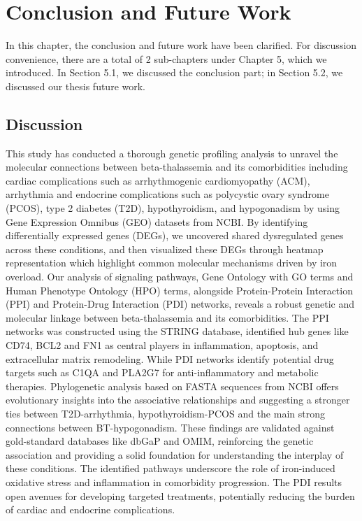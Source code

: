 %
% 
\let\textcircled=\pgftextcircled
\chapter{Conclusion and Future Work}
\label{chap:result}
In this chapter, the conclusion and future work have been clarified. For discussion convenience, there are a total of 2 sub-chapters under Chapter 5, which we introduced. In Section 5.1, we discussed the conclusion part; in Section 5.2, we discussed our thesis future work.

\vspace{150mm}

\section{Discussion}
This study has conducted a thorough genetic profiling analysis to unravel the molecular connections between beta-thalassemia and its comorbidities including cardiac complications such as arrhythmogenic cardiomyopathy (ACM), arrhythmia and endocrine complications such as polycystic ovary syndrome (PCOS), type 2 diabetes (T2D), hypothyroidism, and hypogonadism by using Gene Expression Omnibus (GEO) datasets from NCBI. By identifying differentially expressed genes (DEGs), we uncovered shared dysregulated genes across these conditions, and then visualized these DEGs through heatmap representation which highlight common molecular mechanisms driven by iron overload. Our analysis of signaling pathways, Gene Ontology with GO terms and Human Phenotype Ontology (HPO) terms, alongside Protein-Protein Interaction (PPI) and Protein-Drug Interaction (PDI) networks, reveals a robust genetic and molecular linkage between beta-thalassemia and its comorbidities. The PPI networks was constructed using the STRING database, identified hub genes like CD74, BCL2 and FN1 as central players in inflammation, apoptosis, and extracellular matrix remodeling. While PDI networks identify potential drug targets such as C1QA and PLA2G7 for anti-inflammatory and metabolic therapies. Phylogenetic analysis based on FASTA sequences from NCBI offers evolutionary insights into the associative relationships and suggesting a stronger ties between T2D-arrhythmia, hypothyroidism-PCOS and the main strong connections between BT-hypogonadism. These findings are validated against gold-standard databases like dbGaP and OMIM, reinforcing the genetic association and providing a solid foundation for understanding the interplay of these conditions. The identified pathways underscore the role of iron-induced oxidative stress and inflammation in comorbidity progression. The PDI results open avenues for developing targeted treatments, potentially reducing the burden of cardiac and endocrine complications. \\


